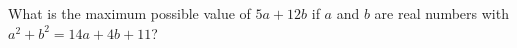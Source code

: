 What is the maximum possible value of $5a+12b$ if $a$ and $b$ are real numbers with $a^2+b^2=14a+4b+11$?
